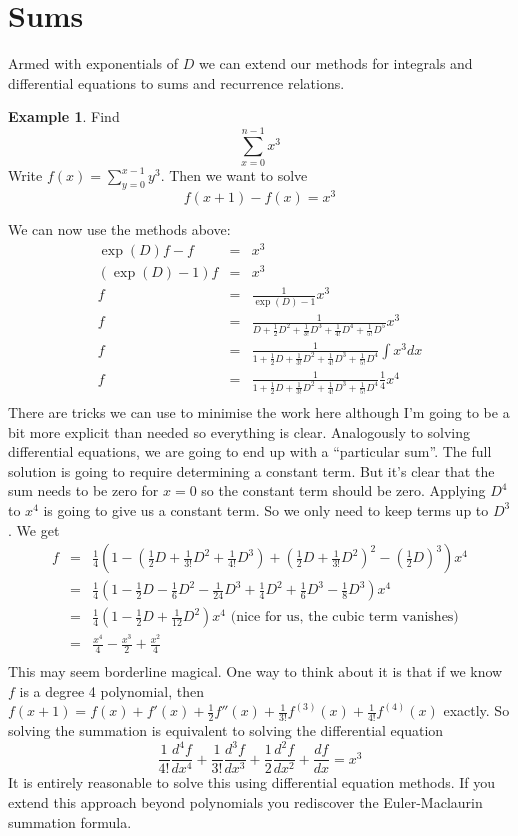 \documentclass[a4paper]{article}
\theoremstyle{definition}
\newtheorem{example}{Example}[section]
\begin{document}
\section{Sums}
Armed with exponentials of $D$ we can extend our methods for integrals and differential equations to sums and recurrence relations.
\begin{example}
Find
\[
\sum_{x=0}^{n-1}x^3
\]
Write $f(x) = \sum_{y=0}^{x-1}y^3$.
Then we want to solve
\[
f(x+1)-f(x) = x^3
\]
\end{example}
We can now use the methods above:
\begin{eqnarray*}
\exp(D)f-f & = & x^3 \\
(\exp(D)-1)f & = & x^3 \\
f & = & \frac{1}{\exp(D)-1}x^3 \\
f & = & \frac{1}{D+\frac{1}{2}D^2+\frac{1}{3!}D^3+\frac{1}{4!}D^4+\frac{1}{5!}D^5}x^3 \\
f & = & \frac{1}{1+\frac{1}{2}D+\frac{1}{3!}D^2+\frac{1}{4!}D^3+\frac{1}{5!}D^4}\int x^3dx \\
f & = & \frac{1}{1+\frac{1}{2}D+\frac{1}{3!}D^2+\frac{1}{4!}D^3+\frac{1}{5!}D^4}\frac{1}{4}x^4 \\
\end{eqnarray*}
There are tricks we can use to minimise the work here although I'm going to be a bit more explicit than needed so everything is clear.
Analogously to solving differential equations, we are going to end up with a ``particular sum''.
The full solution is going to require determining a constant term.
But it's clear that the sum needs to be zero for $x=0$ so the constant term should be zero.
Applying $D^4$ to $x^4$ is going to give us a constant term.
So we only need to keep terms up to $D^3$.
We get
\begin{eqnarray*}
f & = & \frac{1}{4}(1-(\frac{1}{2}D+\frac{1}{3!}D^2+\frac{1}{4!}D^3)+
        (\frac{1}{2}D+\frac{1}{3!}D^2)^2-(\frac{1}{2}D)^3)x^4 \\
  & = & \frac{1}{4}(1-\frac{1}{2}D-\frac{1}{6}D^2-\frac{1}{24}D^3+
        \frac{1}{4}D^2+\frac{1}{6}D^3-\frac{1}{8}D^3)x^4 \\
  & = & \frac{1}{4}(1-\frac{1}{2}D+\frac{1}{12}D^2)x^4 \mbox{ (nice for us, the cubic term vanishes)} \\
  & = & \frac{x^4}{4}-\frac{x^3}{2}+\frac{x^2}{4} \\
\end{eqnarray*}
This may seem borderline magical.
One way to think about it is that if we know $f$ is a degree 4 polynomial, then $f(x+1) = f(x)+f'(x)+\frac{1}{2}f''(x)+\frac{1}{3!}f^{(3)}(x)+\frac{1}{4!}f^{(4)}(x)$ exactly.
So solving the summation is equivalent to solving the differential equation
\[
\frac{1}{4!}\frac{d^4f}{dx^4}+\frac{1}{3!}\frac{d^3f}{dx^3}+\frac{1}{2}\frac{d^2f}{dx^2}+\frac{df}{dx} = x^3
\]
It is entirely reasonable to solve this using differential equation methods.
If you extend this approach beyond polynomials you rediscover the Euler-Maclaurin summation formula.
\end{document}
